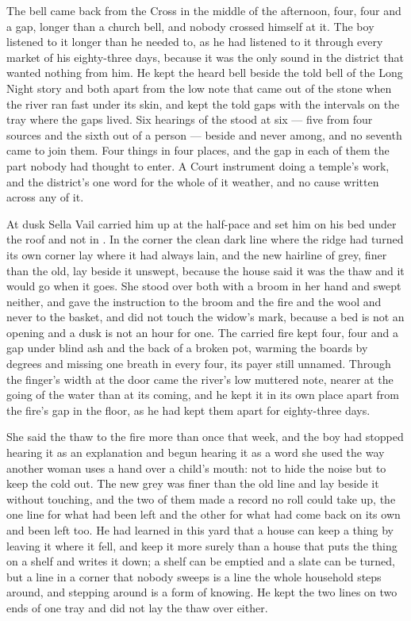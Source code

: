 The bell came back from the Cross in the middle of the afternoon, four, four and a gap, longer than a church bell, and nobody crossed himself at it. The boy listened to it longer than he needed to, as he had listened to it through every market of his eighty-three days, because it was the only sound in the district that wanted nothing from him. He kept the heard bell beside the told bell of the Long Night story and both apart from the low note that came out of the stone when the river ran fast under its skin, and kept the told gaps with the intervals on the tray where the gaps lived. Six hearings of the  stood at six --- five from four sources and the sixth out of a person --- beside and never among, and no seventh came to join them. Four things in four places, and the gap in each of them the part nobody had thought to enter. A Court instrument doing a temple's work, and the district's one word for the whole of it weather, and no cause written across any of it.

\scenebreak

At dusk Sella Vail carried him up  at the half-pace and set him on his bed under the  roof and not in . In the corner the clean dark line where the  ridge had turned its own corner lay where it had always lain, and the new hairline of grey, finer than the old, lay beside it unswept, because the house said it was the thaw and it would go when it goes. She stood over both with a broom in her hand and swept neither, and gave the instruction to the broom and the fire and the wool and never to the basket, and did not touch the widow's mark, because a bed is not an opening and a dusk is not an hour for one. The carried fire kept four, four and a gap under blind ash and the back of a broken pot, warming the boards by degrees and missing one breath in every four, its payer still unnamed. Through the finger's width at the door came the river's low muttered note, nearer at the going of the water than at its coming, and he kept it in its own place apart from the fire's gap in the floor, as he had kept them apart for eighty-three days.

She said the thaw to the fire more than once that week, and the boy had stopped hearing it as an explanation and begun hearing it as a word she used the way another woman uses a hand over a child's mouth: not to hide the noise but to keep the cold out. The new grey was finer than the old line and lay beside it without touching, and the two of them made a record no roll could take up, the one line for what had been left and the other for what had come back on its own and been left too. He had learned in this yard that a house can keep a thing by leaving it where it fell, and keep it more surely than a house that puts the thing on a shelf and writes it down; a shelf can be emptied and a slate can be turned, but a line in a corner that nobody sweeps is a line the whole household steps around, and stepping around is a form of knowing. He kept the two lines on two ends of one tray and did not lay the thaw over either.


